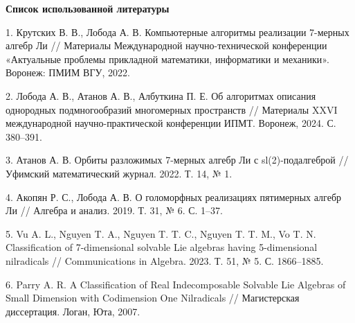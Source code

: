 \documentclass[12pt]{article}
\begin{document}
\pagebreak
\begin{center}
\textbf{Список использованной литературы}
\end{center}

1. Крутских В. В., Лобода А. В. Компьютерные алгоритмы реализации 7-мерных алгебр Ли // Материалы Международной научно-технической конференции «Актуальные проблемы прикладной математики, информатики и механики». Воронеж: ПМИМ ВГУ, 2022.

2. Лобода А. В., Атанов А. В., Албуткина П. Е. Об алгоритмах описания однородных подмногообразий многомерных пространств // Материалы XXVI международной научно-практической конференции ИПМТ. Воронеж, 2024. С. 380–391.

3. Атанов А. В. Орбиты разложимых 7-мерных алгебр Ли с sl(2)-подалгеброй // Уфимский математический журнал. 2022. Т. 14, № 1.

4. Акопян Р. С., Лобода А. В. О голоморфных реализациях пятимерных алгебр Ли // Алгебра и анализ. 2019. Т. 31, № 6. С. 1–37. 

5. Vu A. L., Nguyen T. A., Nguyen T. T. C., Nguyen T. T. M., Vo T. N. Classification of 7-dimensional solvable Lie algebras having 5-dimensional nilradicals // Communications in Algebra. 2023. Т. 51, № 5. С. 1866–1885.

6. Parry A. R. A Classification of Real Indecomposable Solvable Lie Algebras of Small Dimension with Codimension One Nilradicals // Магистерская диссертация. Логан, Юта, 2007.
\end{document}
